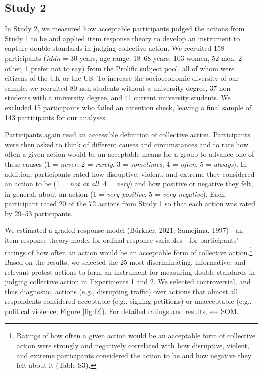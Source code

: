 \documentclass[twocolumn, 11pt, letterpaper]{article}
\begin{document}
\hypertarget{study-2}{%
\subsection{Study 2}\label{study-2}}

In Study 2, we measured how acceptable participants judged the actions
from Study 1 to be and applied item response theory to develop an
instrument to capture double standards in judging collective action. We
recruited 158 participants (\(\textit{Mdn} = 30\) years, age range:
18--68 years; 103 women, 52 men, 2 other, 1 prefer not to say) from the
Prolific subject pool, all of whom were citizens of the UK or the US. To
increase the socioeconomic diversity of our sample, we recruited 80
non-students without a university degree, 37 non-students with a
university degree, and 41 current university students. We excluded 15
participants who failed an attention check, leaving a final sample of
143 participants for our analyses.

Participants again read an accessible definition of collective action.
Participants were then asked to think of different causes and
circumstances and to rate how often a given action would be an
acceptable means for a group to advance one of these causes (1 =
\emph{never}, 2 = \emph{rarely}, 3 = \emph{sometimes}, 4 = \emph{often},
5 = \emph{always}). In addition, participants rated how disruptive,
violent, and extreme they considered an action to be (1 = \emph{not at
all}, 4 = \emph{very}) and how positive or negative they felt, in
general, about an action (1 = \emph{very positive}, 5 = \emph{very
negative}). Each participant rated 20 of the 72 actions from Study 1 so
that each action was rated by 29--53 participants.

We estimated a graded response model (Bürkner, 2021; Samejima,
1997)---an item response theory model for ordinal response
variables---for participants' ratings of how often an action would be an
acceptable form of collective action.\footnote{Ratings of how often a
  given action would be an acceptable form of collective action were
  strongly and negatively correlated with how disruptive, violent, and
  extreme participants considered the action to be and how negative they
  felt about it (Table S3).} Based on the results, we selected the 25
most discriminating, informative, and relevant protest actions to form
an instrument for measuring double standards in judging collective
action in Experiments 1 and 2. We selected controversial, and thus
diagnostic, actions (e.g., disrupting traffic) over actions that almost
all respondents considered acceptable (e.g., signing petitions) or
unacceptable (e.g., political violence; Figure \ref{fig:f2}). For
detailed ratings and results, see SOM.
\end{document}
